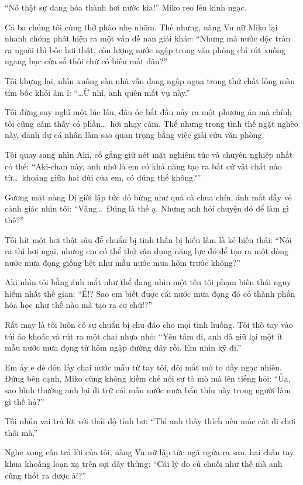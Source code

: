 \documentclass[../main.tex]{subfiles}
\begin{document}
``Nó thật sự đang hóa thành hơi nước kìa!'' Miko reo lên kinh ngạc.

Cả ba chúng tôi cùng thở phào nhẹ nhõm. Thế nhưng, nàng Vu nữ Miko lại nhanh chóng phát hiện ra một vấn đề nan giải khác:
``Nhưng mà nước độc tràn ra ngoài thì bốc hơi thật, còn lượng nước ngập trong văn phòng chỉ rút xuống ngang bục cửa sổ thôi chứ có biến mất đâu?''

Tôi khựng lại, nhìn xuống sàn nhà vẫn đang ngập ngụa trong thứ chất lỏng màu tím bốc khói âm ỉ: ``\dots Ừ nhỉ, anh quên mất vụ này.''

Tôi đứng suy nghĩ một lúc lâu, đầu óc bắt đầu nảy ra một phương án mà chính tôi cũng cảm thấy có phần\dots\ hơi nhạy cảm. Thế nhưng trong tình thế ngặt nghèo này, danh dự cá nhân làm sao quan trọng bằng việc giải cứu văn phòng.

Tôi quay sang nhìn Aki, cố gắng giữ nét mặt nghiêm túc và chuyên nghiệp nhất có thể:
``Aki-chan này, anh nhớ là em có khả năng tạo ra bất cứ vật chất nào từ\dots\ khoảng giữa hai đùi của em, có đúng thế không?''

Gương mặt nàng Dị giới lập tức đỏ bừng như quả cà chua chín, ánh mắt đầy vẻ cảnh giác nhìn tôi:
``Vâng\dots\ Đúng là thế ạ. Nhưng anh hỏi chuyện đó để làm gì thế?''

Tôi hít một hơi thật sâu để chuẩn bị tinh thần bị hiểu lầm là kẻ biến thái:
``Nói ra thì hơi ngại, nhưng em có thể thử vận dụng năng lực đó để tạo ra một dòng nước mưa đọng giống hệt như mẫu nước mưa hôm trước không?''

Aki nhìn tôi bằng ánh mắt như thể đang nhìn một tên tội phạm biến thái nguy hiểm nhất thế gian: ``Ể!? Sao em biết được cái nước mưa đọng đó có thành phần hóa học như thế nào mà tạo ra cơ chứ!?''

Rất may là tôi luôn có sự chuẩn bị chu đáo cho mọi tình huống. Tôi thò tay vào túi áo khoác và rút ra một chai nhựa nhỏ:
``Yên tâm đi, anh đã giữ lại một ít mẫu nước mưa đọng từ hôm ngập đường đây rồi. Em nhìn kỹ đi.''

Em ấy e dè đón lấy chai nước mẫu từ tay tôi, đôi mắt mở to đầy ngạc nhiên. Đứng bên cạnh, Miko cũng không kiềm chế nổi sự tò mò mà lên tiếng hỏi:
``Ủa, sao bình thường anh lại đi trữ cái mẫu nước mưa bẩn thỉu này trong người làm gì thế hả?''

Tôi nhún vai trả lời với thái độ tỉnh bơ:
``Thì anh thấy thích nên múc cất đi chơi thôi mà.''

Nghe xong câu trả lời của tôi, nàng Vu nữ lập tức ngã ngửa ra sau, hai chân tay khua khoắng loạn xạ trên sợi dây thừng:
``Cái lý do củ chuối như thế mà anh cũng thốt ra được à!?''
\end{document}
